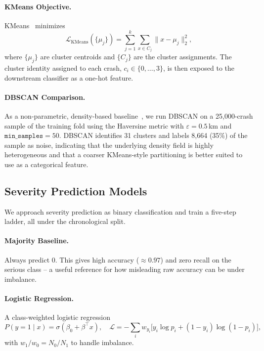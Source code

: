 \documentclass{article}
\begin{document}
\paragraph{KMeans Objective.} KMeans~\cite{macqueen1967kmeans} minimizes
\begin{equation}
\mathcal{L}_{\text{KMeans}}(\{\mu_j\}) =
\sum_{j=1}^{k}\sum_{x\in C_j}\|x - \mu_j\|_2^2 ,
\label{eq:kmeans}
\end{equation}
where $\{\mu_j\}$ are cluster centroids and $\{C_j\}$ are the cluster
assignments. The cluster identity assigned to each crash, $c_i \in \{0,
\dots, 3\}$, is then exposed to the downstream classifier as a one-hot
feature.

\paragraph{DBSCAN Comparison.} As a non-parametric, density-based
baseline~\cite{ester1996dbscan}, we run DBSCAN on a 25,000-crash sample of the
training fold using the Haversine metric with $\varepsilon = 0.5$\,km and
$\texttt{min\_samples} = 50$. DBSCAN identifies 31 clusters and labels
8,664 (35\%) of the sample as noise, indicating that the underlying density
field is highly heterogeneous and that a coarser KMeans-style partitioning is
better suited to use as a categorical feature.

\subsection{Severity Prediction Models}
\label{sec:models}
We approach severity prediction as binary classification and train a five-step
ladder, all under the chronological split.

\paragraph{Majority Baseline.} Always predict 0. This gives high accuracy
($\approx 0.97$) and zero recall on the serious class -- a useful reference
for how misleading raw accuracy can be under imbalance.

\paragraph{Logistic Regression.} A class-weighted logistic regression
\begin{equation}
P(y=1 \mid x) = \sigma(\beta_0 + \beta^{\top} x),
\quad \mathcal{L} = -\sum_i w_{y_i}\bigl[y_i\log p_i + (1-y_i)\log(1-p_i)\bigr],
\label{eq:logreg}
\end{equation}
with $w_1 / w_0 = N_0 / N_1$ to handle imbalance.
\end{document}
